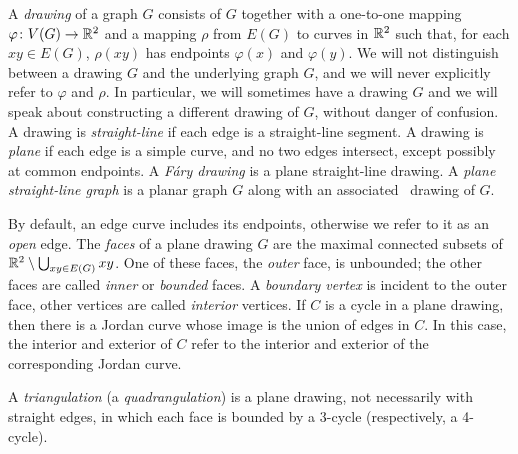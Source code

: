 A \emph{drawing} %
of a graph $G$ consists of $G$ together with
 a one-to-one mapping $\varphi\colon V(G)\to\mathbb{R}^2$ and a mapping $\rho$ from
$E(G)$ to curves in $\mathbb{R}^2$ such that, for each $xy\in E(G)$, $\rho(xy)$
has endpoints $\varphi(x)$ and $\varphi(y)$.
We will not distinguish between a drawing $G$ and the underlying graph
$G$, and we will never
explicitly refer to $\varphi$ and $\rho$.
In particular, we will sometimes have a drawing $G$ and we will speak about constructing
a different drawing of $G$, without danger of confusion.
%
A drawing is \emph{straight-line} if each edge is a straight-line
segment. A drawing is \emph{plane} if each edge is a simple curve, and no
two edges intersect, except possibly at common endpoints. A
\emph{F\'ary drawing} is a plane straight-line drawing.
A \emph{plane straight-line graph} is a planar graph $G$ along with an associated \Fary\ drawing of $G$.

By default, an edge curve includes
its endpoints, otherwise we refer to it as an \emph{open} edge.
%
The \emph{faces} of a plane drawing $G$ are the maximal connected
subsets of $\mathbb{R}^2\setminus\bigcup_{xy\in E(G)} xy$.  One of
these faces, the \emph{outer} face, is unbounded; the other faces are called \emph{inner} or \emph{bounded} faces. A {\em boundary vertex} is incident to the outer face, other vertices are called \emph{interior} vertices.
 If
 $C$ is a
cycle %
 in a plane drawing, then
 there is a 
Jordan curve whose image
is the union of edges in $C$.  In this case, the interior and exterior of
$C$ refer to the interior and exterior of the corresponding Jordan curve.

A \emph{triangulation} (a \emph{quadrangulation}) is a plane drawing,
not necessarily with straight edges,
in which each face is bounded by a 3-cycle (respectively, a 4-cycle). 

